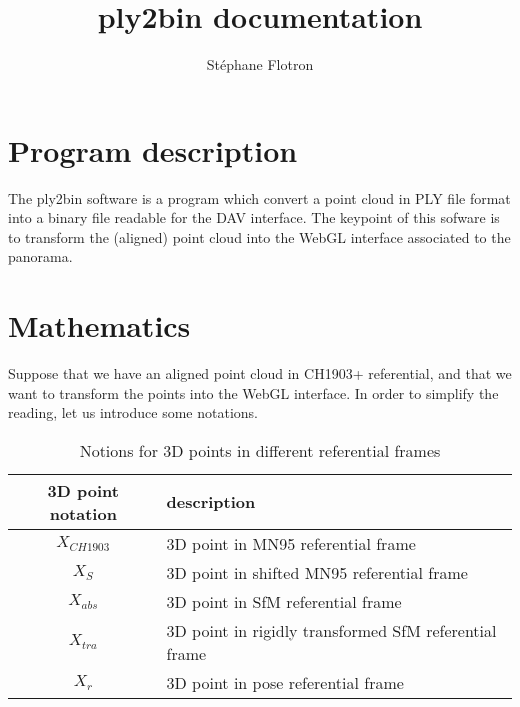 \documentclass[a4paper, 11pt]{article}
\author{ St\'ephane Flotron }
\title{\textbf{ply2bin documentation}}
\begin{document}
   \maketitle
   
   \section*{Program description}
   
   The ply2bin software is a program which convert a point cloud in PLY file format into 
   a binary file readable for the DAV interface. 
   The keypoint of this sofware is to transform the (aligned) point cloud into the WebGL
   interface associated to the panorama.
   
   \section*{Mathematics}
   
   Suppose that we have an aligned point cloud in CH1903+ referential, and that we want to transform the points into
   the WebGL interface. In order to simplify the reading, let us introduce some notations. 
   
   \begin{table}[H]
      \begin{center}
        \begin{tabular}{|c|l|}
                \hline 
                    3D point notation & description \\
                \hline
                    $X_{CH1903}$ & 3D point in MN95 referential frame \\
                    $X_S$     & 3D point in shifted MN95 referential frame \\
                    $X_{abs}$ & 3D point in SfM referential frame \\
                    $X_{tra}$ & 3D point in rigidly transformed SfM referential frame \\
                    $X_r$     & 3D point in pose referential frame \\
                \hline
        \end{tabular}
      \end{center}
      \label{3D point notation}
      \caption{Notions for 3D points in different referential frames}
   \end{table}
   
\end{document}
